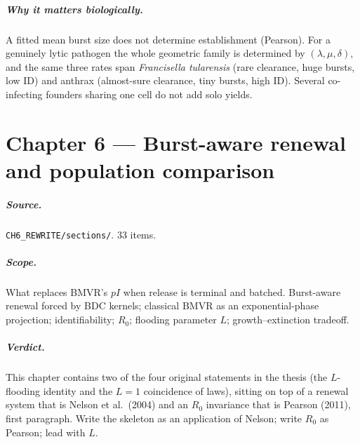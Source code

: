 \documentclass[11pt,a4paper]{report}
\newcommand{\ft}{\textit{Francisella tularensis}}
\begin{document}
\paragraph{Why it matters biologically.}
A fitted mean burst size does not determine establishment (Pearson). For
a genuinely lytic pathogen the whole geometric family is determined by
\((\lambda,\mu,\delta)\), and the same three rates span \ft{} (rare
clearance, huge bursts, low ID) and anthrax (almost-sure clearance, tiny
bursts, high ID). Several co-infecting founders sharing one cell do not
add solo yields.

\chapter{Chapter 6 --- Burst-aware renewal and population comparison}
\label{ch:6}

\paragraph{Source.} \texttt{CH6\_REWRITE/sections/}. 33 items.

\paragraph{Scope.}
What replaces BMVR's \(pI\) when release is terminal and batched.
Burst-aware renewal forced by BDC kernels; classical BMVR as an
exponential-phase projection; identifiability; \(R_0\); flooding
parameter \(L\); growth--extinction tradeoff.

\paragraph{Verdict.}
This chapter contains two of the four original statements in the thesis
(the \(L\)-flooding identity and the \(L=1\) coincidence of laws), sitting
on top of a renewal system that is Nelson et al.\ (2004) and an \(R_0\)
invariance that is Pearson (2011), first paragraph. Write the skeleton as
an application of Nelson; write \(R_0\) as Pearson; lead with \(L\).
\end{document}

